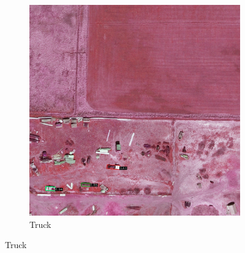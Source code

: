 \begin{figure}[h!]
\begin{subfigure}[t]{0.38\textwidth}
        \includegraphics[width=\linewidth]{images/015Results/02perm_exp/comp_images/rirb/212.png}
        \caption{Truck}
    \end{subfigure}
    

\end{figure}
